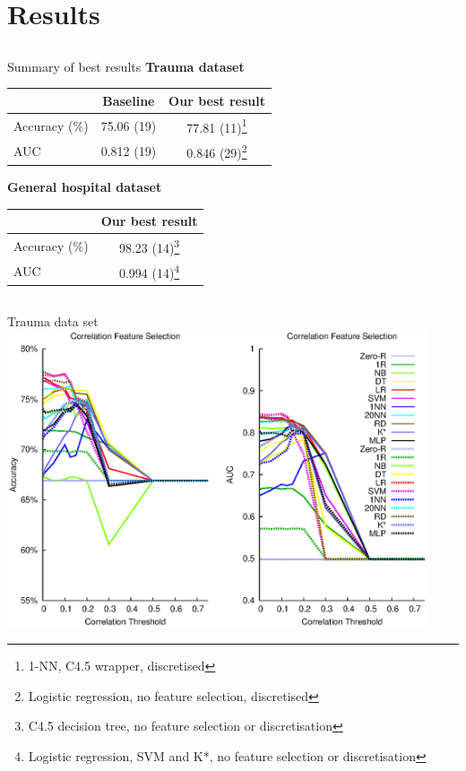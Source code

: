\documentclass[compress]{beamer}
\begin{document}
\section{Results}
\subsection{}
\begin{frame}{Summary of best results}
\textbf{Trauma dataset}
\begin{center}
\begin{tabular}{l|cc}
 & Baseline & Our best result \\
\hline
Accuracy (\%) & 75.06 (19) & \textcolor{emerald}{77.81} (\textcolor{emerald}{11})\footnote{1-NN, C4.5 wrapper, discretised} \\
AUC & 0.812 (19) & \textcolor{emerald}{0.846} (\textcolor{sydneyred}{29})\footnote{Logistic regression, no feature selection, discretised} \\
\end{tabular}
\end{center}

\pause
\textbf{General hospital dataset}
\begin{center}
\begin{tabular}{l|c}
 & Our best result \\
\hline
Accuracy (\%) & 98.23 (14)\footnote{C4.5 decision tree, no feature selection or discretisation} \\
AUC & 0.994 (14)\footnote{Logistic regression, SVM and K*, no feature selection or discretisation} \\
\end{tabular}
\end{center}
\end{frame}

\subsection{}
\begin{frame}{Trauma data set}
\includegraphics[width=0.93\textwidth]{tr-corr.eps}
\end{frame}
\end{document}
